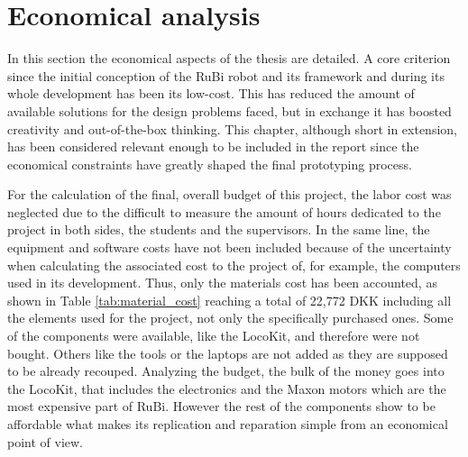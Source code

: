 \chapter{Economical analysis} %
\label{cha:economical_aspects}
In this section the economical aspects of the thesis are detailed.
A core criterion since the initial conception of the RuBi robot and its framework and during its whole development has been its low-cost.
This has reduced the amount of available solutions for the design problems faced, but in exchange it has boosted creativity and out-of-the-box thinking.
This chapter, although short in extension, has been considered relevant enough to be included in the report since the economical constraints have greatly shaped the final prototyping process.

For the calculation of the final, overall budget of this project, the labor cost was neglected due to the difficult to measure the amount of hours dedicated to the project in both sides, the students and the supervisors.
In the same line, the equipment and software costs have not been included because of the uncertainty when calculating the associated cost to the project of, for example, the computers used in its development.
Thus, only the materials cost has been accounted, as shown in Table \ref{tab:material_cost} reaching a total of 22,772 DKK including all the elements used for the project, not only the specifically purchased ones.
Some of the components were available, like the LocoKit, and therefore were not bought.
Others like the tools or the laptops are not added as they are supposed to be already recouped.
Analyzing the budget, the bulk of the money goes into the LocoKit, that includes the electronics and the Maxon motors which are the most expensive part of RuBi.
However the rest of the components show to be affordable what makes its replication and reparation simple from an economical point of view.


\newpage \mbox{}

